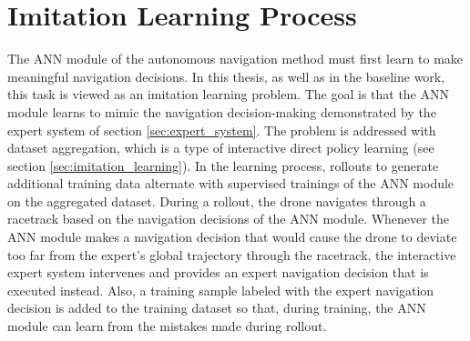 \section{Imitation Learning Process} \label{sec:training}
The ANN module of the autonomous navigation method 
must first learn to make meaningful navigation decisions.
In this thesis, as well as in the baseline work,
this task is viewed as an imitation learning problem.
The goal is that the ANN module learns to mimic
the navigation decision-making demonstrated by the expert system
of section \ref{sec:expert_system}.
The problem is addressed with dataset aggregation,
which is a type of interactive direct policy learning
(see section \ref{sec:imitation_learning}).
In the learning process, 
rollouts to generate additional training data 
alternate with supervised trainings of the ANN module on the aggregated dataset.
During a rollout, the drone navigates through a racetrack
based on the navigation decisions of the ANN module.
Whenever the ANN module makes a navigation decision 
that would cause the drone to deviate too far from the
expert's global trajectory through the racetrack, 
the interactive expert system intervenes 
and provides an expert navigation decision that is executed instead.
Also, 
a training sample labeled with the expert navigation decision 
is added to the training dataset 
so that, during training, the ANN module can learn from the mistakes made
during rollout.



